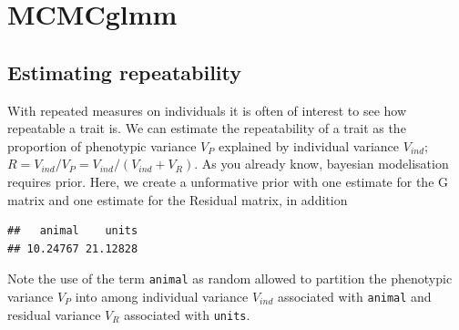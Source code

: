 \documentclass[
  12pt,
]{book}
\newenvironment{Shaded}{\begin{snugshade}}{\end{snugshade}}
\newcommand{\CommentTok}[1]{\textcolor[rgb]{0.56,0.35,0.01}{\textit{#1}}}
\newcommand{\DataTypeTok}[1]{\textcolor[rgb]{0.13,0.29,0.53}{#1}}
\newcommand{\DecValTok}[1]{\textcolor[rgb]{0.00,0.00,0.81}{#1}}
\newcommand{\FloatTok}[1]{\textcolor[rgb]{0.00,0.00,0.81}{#1}}
\newcommand{\KeywordTok}[1]{\textcolor[rgb]{0.13,0.29,0.53}{\textbf{#1}}}
\newcommand{\NormalTok}[1]{#1}
\newcommand{\OperatorTok}[1]{\textcolor[rgb]{0.81,0.36,0.00}{\textbf{#1}}}
\newcommand{\OtherTok}[1]{\textcolor[rgb]{0.56,0.35,0.01}{#1}}
\newcommand{\StringTok}[1]{\textcolor[rgb]{0.31,0.60,0.02}{#1}}
\begin{document}
\hypertarget{mcmcglmm-3}{%
\section{MCMCglmm}\label{mcmcglmm-3}}

\hypertarget{estimating-repeatability-1}{%
\subsection{Estimating repeatability}\label{estimating-repeatability-1}}

With repeated measures on individuals it is often of interest to see how repeatable a trait is.
We can estimate the repeatability of a trait as the proportion of phenotypic variance \(V_P\) explained by individual variance \(V_{ind}\); \(R = V_{ind}/V_P = V_{ind}/(V_{ind}+V_R)\).
As you already know, bayesian modelisation requires prior. Here, we create a unformative prior with one estimate for the G matrix and one estimate for the Residual matrix, in addition

\begin{Shaded}
\end{Shaded}

\begin{verbatim}
##   animal    units 
## 10.24767 21.12828
\end{verbatim}

Note the use of the term \texttt{animal} as random allowed to partition the phenotypic variance \(V_P\) into among individual variance \(V_{ind}\) associated with \texttt{animal} and residual variance \(V_R\) associated with \texttt{units}.
\end{document}
